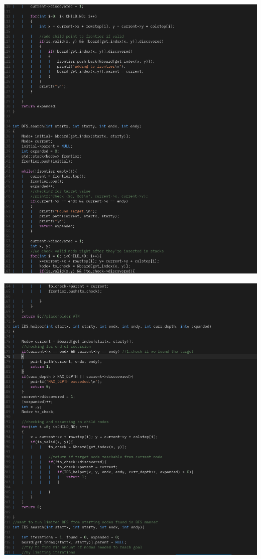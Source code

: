 \documentclass{article}
\begin{document}
\includegraphics[scale=0.5]{sc3.png}

\includegraphics[scale=0.5]{sc4.png}
\end{document}
